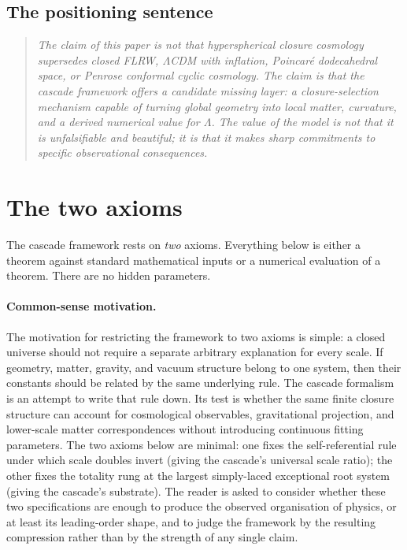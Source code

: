 \documentclass[11pt]{article}
\theoremstyle{plain}
\theoremstyle{definition}
\theoremstyle{remark}
\begin{document}
\subsection{The positioning sentence}\label{sec:bridge-position}

\begin{quote}
\textit{The claim of this paper is not that hyperspherical closure cosmology supersedes closed FLRW, $\Lambda$CDM with inflation, Poincar\'e dodecahedral space, or Penrose conformal cyclic cosmology. The claim is that the cascade framework offers a candidate missing layer: a closure-selection mechanism capable of turning global geometry into local matter, curvature, and a derived numerical value for $\Lambda$. The value of the model is not that it is unfalsifiable and beautiful; it is that it makes sharp commitments to specific observational consequences.}
\end{quote}

\section{The two axioms}\label{sec:axioms}

The cascade framework rests on \emph{two} axioms. Everything below is either a theorem against standard mathematical inputs or a numerical evaluation of a theorem. There are no hidden parameters.

\paragraph{Common-sense motivation.} The motivation for restricting the framework to two axioms is simple: a closed universe should not require a separate arbitrary explanation for every scale. If geometry, matter, gravity, and vacuum structure belong to one system, then their constants should be related by the same underlying rule. The cascade formalism is an attempt to write that rule down. Its test is whether the same finite closure structure can account for cosmological observables, gravitational projection, and lower-scale matter correspondences without introducing continuous fitting parameters. The two axioms below are minimal: one fixes the self-referential rule under which scale doubles invert (giving the cascade's universal scale ratio); the other fixes the totality rung at the largest simply-laced exceptional root system (giving the cascade's substrate). The reader is asked to consider whether these two specifications are enough to produce the observed organisation of physics, or at least its leading-order shape, and to judge the framework by the resulting compression rather than by the strength of any single claim.
\end{document}
